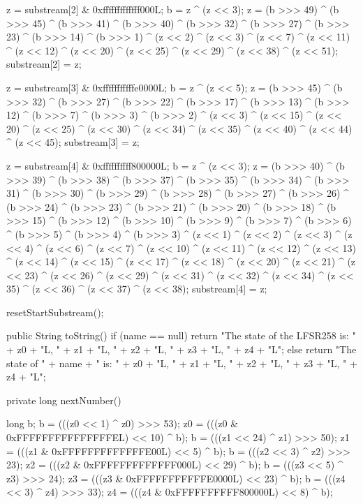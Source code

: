 \begin{code}
\begin{hide}
{        z = substream[2] & 0xfffffffffffff000L;
        b = z ^ (z << 3);
        z = (b >>> 49) ^ (b >>> 45) ^ (b >>> 41) ^ (b >>> 40) ^ (b >>> 32) ^
            (b >>> 27) ^ (b >>> 23) ^ (b >>> 14) ^ (b >>> 1) ^ (z << 2) ^
            (z << 3) ^ (z << 7) ^ (z << 11) ^ (z << 12) ^ (z << 20) ^
            (z << 25) ^ (z << 29) ^ (z << 38) ^ (z << 51);
        substream[2] = z;



        z = substream[3] & 0xfffffffffffe0000L;
        b = z ^ (z << 5);
        z = (b >>> 45) ^ (b >>> 32) ^ (b >>> 27) ^ (b >>> 22) ^ (b >>> 17) ^
            (b >>> 13) ^ (b >>> 12) ^ (b >>> 7) ^ (b >>> 3) ^ (b >>> 2) ^
            (z << 3) ^ (z << 15) ^ (z << 20) ^ (z << 25) ^ (z << 30) ^
            (z << 34) ^ (z << 35) ^ (z << 40) ^ (z << 44) ^ (z << 45);
        substream[3] = z;


        z = substream[4] & 0xffffffffff800000L;
        b = z ^ (z << 3);
        z = (b >>> 40) ^ (b >>> 39) ^ (b >>> 38) ^ (b >>> 37) ^ (b >>> 35) ^
            (b >>> 34) ^ (b >>> 31) ^ (b >>> 30) ^ (b >>> 29) ^ (b >>> 28) ^
            (b >>> 27) ^ (b >>> 26) ^ (b >>> 24) ^ (b >>> 23) ^ (b >>> 21) ^
            (b >>> 20) ^ (b >>> 18) ^ (b >>> 15) ^ (b >>> 12) ^ (b >>> 10) ^
            (b >>> 9) ^ (b >>> 7) ^ (b >>> 6) ^ (b >>> 5) ^ (b >>> 4) ^
            (b >>> 3) ^ (z << 1) ^ (z << 2) ^ (z << 3) ^ (z << 4) ^ (z << 6) ^
            (z << 7) ^ (z << 10) ^ (z << 11) ^ (z << 12) ^ (z << 13) ^
            (z << 14) ^ (z << 15) ^ (z << 17) ^ (z << 18) ^ (z << 20) ^
            (z << 21) ^ (z << 23) ^ (z << 26) ^ (z << 29) ^ (z << 31) ^
            (z << 32) ^ (z << 34) ^ (z << 35) ^ (z << 36) ^ (z << 37) ^
            (z << 38);
        substream[4] = z;

        resetStartSubstream();
    }


    public String toString() {
        if (name == null)
            return "The state of the LFSR258 is: " +
                   z0 + "L, " + z1 + "L, " + z2 + "L, " + z3 + "L, " + z4 + "L";
        else
            return "The state of " + name + " is: " +
                   z0 + "L, " + z1 + "L, " + z2 + "L, " + z3 + "L, " + z4 + "L";
    }


    private long nextNumber() {
       long b;
       b  = (((z0 <<  1) ^ z0) >>> 53);
       z0 = (((z0 & 0xFFFFFFFFFFFFFFFEL) << 10) ^ b);
       b  = (((z1 << 24) ^ z1) >>> 50);
       z1 = (((z1 & 0xFFFFFFFFFFFFFE00L) <<  5) ^ b);
       b  = (((z2 <<  3) ^ z2) >>> 23);
       z2 = (((z2 & 0xFFFFFFFFFFFFF000L) << 29) ^ b);
       b  = (((z3 <<  5) ^ z3) >>> 24);
       z3 = (((z3 & 0xFFFFFFFFFFFE0000L) << 23) ^ b);
       b  = (((z4 <<  3) ^ z4) >>> 33);
       z4 = (((z4 & 0xFFFFFFFFFF800000L) <<  8) ^ b);

}
\end{hide}
\end{code}
